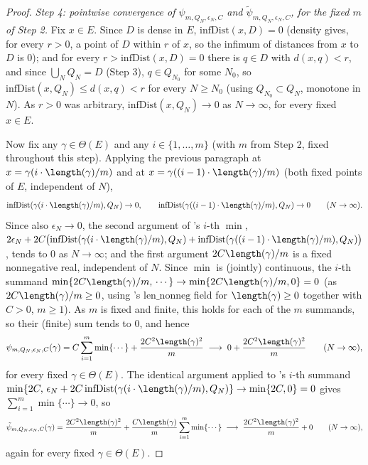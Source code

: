\begin{proof}
  \emph{Step 4: pointwise convergence of $\psi_{m,Q_N,\epsilon_N,C}$ and
  $\tilde\psi_{m,Q_N,\epsilon_N,C}$, for the fixed $m$ of Step 2.} Fix $x \in E$. Since $D$ is dense
  in $E$, $\mathrm{infDist}(x,D) = 0$ (density gives, for every $r>0$, a point of $D$ within $r$ of
  $x$, so the infimum of distances from $x$ to $D$ is $0$); and for every $r > \mathrm{infDist}(x,D)
  = 0$ there is $q \in D$ with $d(x,q) < r$, and since $\bigcup_N Q_N = D$ (Step 3), $q \in Q_{N_0}$
  for some $N_0$, so $\mathrm{infDist}(x,Q_N) \le d(x,q) < r$ for every $N \ge N_0$ (using
  $Q_{N_0} \subset Q_N$, monotone in $N$). As $r>0$ was arbitrary, $\mathrm{infDist}(x,Q_N) \to 0$
  as $N \to \infty$, for every fixed $x \in E$.

  Now fix any $\gamma \in \Theta(E)$ and any $i \in \{1,\dots,m\}$ (with $m$ from Step 2, fixed
  throughout this step). Applying the previous paragraph at $x = \gamma(i\cdot\length(\gamma)/m)$
  and at $x=\gamma((i-1)\cdot\length(\gamma)/m)$ (both fixed points of $E$, independent of $N$),
  \[
    \mathrm{infDist}(\gamma(i\cdot\length(\gamma)/m),Q_N) \to 0
    ,\qquad
    \mathrm{infDist}(\gamma((i-1)\cdot\length(\gamma)/m),Q_N) \to 0
    \qquad(N\to\infty)
    .
  \]
  Since also $\epsilon_N \to 0$, the second argument of 's $i$-th $\min$,
  $2\epsilon_N + 2C\bigl(\mathrm{infDist}(\gamma(i\cdot\length(\gamma)/m),Q_N) +
  \mathrm{infDist}(\gamma((i-1)\cdot\length(\gamma)/m),Q_N)\bigr)$, tends to $0$ as $N\to\infty$; and
  the first argument $2C\length(\gamma)/m$ is a fixed nonnegative real, independent of $N$. Since
  $\min$ is (jointly) continuous, the $i$-th summand $\min\{2C\length(\gamma)/m,\,\cdots\} \to
  \min\{2C\length(\gamma)/m,0\} = 0$ (as $2C\length(\gamma)/m\ge0$, using 's
  $\mathrm{len\_nonneg}$ field for $\length(\gamma)\ge0$ together with $C>0$, $m\ge1$). As $m$ is
  fixed and finite,
  this holds for each of the $m$ summands, so their (finite) sum tends to $0$, and hence
  \[
    \psi_{m,Q_N,\epsilon_N,C}(\gamma) = C\sum_{i=1}^m\min\{\cdots\} + \frac{2C^2\length(\gamma)^2}{m}
    \;\longrightarrow\; 0 + \frac{2C^2\length(\gamma)^2}{m}
    \qquad (N\to\infty)
    ,
  \]
  for every fixed $\gamma \in \Theta(E)$. The identical argument applied to 's
  $i$-th summand $\min\{2C,\,\epsilon_N+2C\,\mathrm{infDist}(\gamma(i\cdot\length(\gamma)/m),Q_N)\}
  \to \min\{2C,0\}=0$ gives $\sum_{i=1}^m\min\{\cdots\}\to0$, so
  \[
    \tilde\psi_{m,Q_N,\epsilon_N,C}(\gamma) = \frac{2C^2\length(\gamma)^2}{m} +
      \frac{C\length(\gamma)}{m}\sum_{i=1}^m\min\{\cdots\}
    \;\longrightarrow\; \frac{2C^2\length(\gamma)^2}{m} + 0
    \qquad(N\to\infty)
    ,
  \]
  again for every fixed $\gamma \in \Theta(E)$.


\end{proof}
